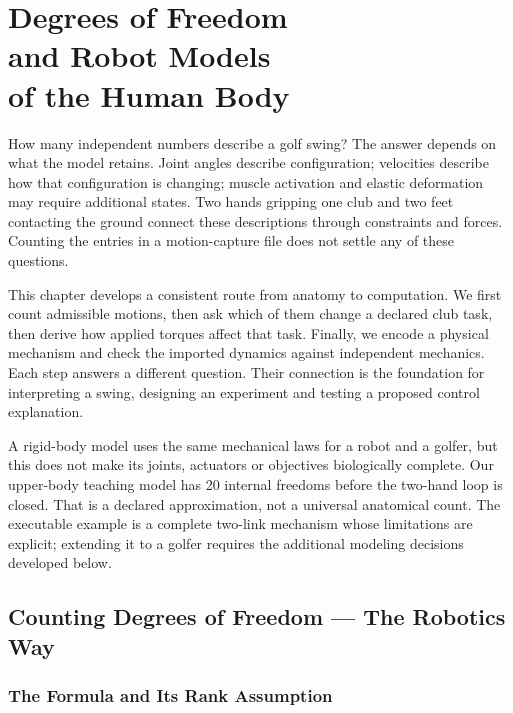 \chapter[Degrees of Freedom and Robot Models of the Human Body]{Degrees of Freedom\\and Robot Models\\of the Human Body}
\label{ch:dof_urdf_models}

How many independent numbers describe a golf swing? The answer depends on what the model retains. Joint angles describe configuration; velocities describe how that configuration is changing; muscle activation and elastic deformation may require additional states. Two hands gripping one club and two feet contacting the ground connect these descriptions through constraints and forces. Counting the entries in a motion-capture file does not settle any of these questions.

This chapter develops a consistent route from anatomy to computation. We first count admissible motions, then ask which of them change a declared club task, then derive how applied torques affect that task. Finally, we encode a physical mechanism and check the imported dynamics against independent mechanics. Each step answers a different question. Their connection is the foundation for interpreting a swing, designing an experiment and testing a proposed control explanation.

A rigid-body model uses the same mechanical laws for a robot and a golfer, but this does not make its joints, actuators or objectives biologically complete. Our upper-body teaching model has 20 internal freedoms before the two-hand loop is closed. That is a declared approximation, not a universal anatomical count. The executable example is a complete two-link mechanism whose limitations are explicit; extending it to a golfer requires the additional modeling decisions developed below.

\section{Counting Degrees of Freedom --- The Robotics Way}
\label{laymans:box:ch23_dof_problem}
\label{sec:grubler_formula}

\subsection{The Formula and Its Rank Assumption}

